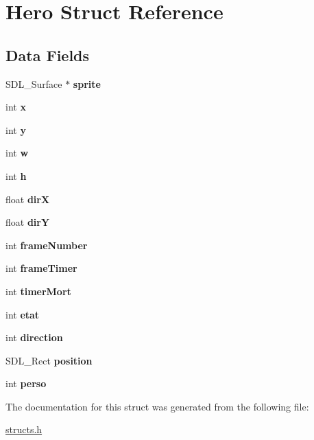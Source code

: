 \hypertarget{structHero}{}\section{Hero Struct Reference}
\label{structHero}
\subsection*{Data Fields}
\begin{DoxyCompactItemize}
\item 
\mbox{\label{structHero_ad857894baa28c986b4d8e5de10eb6473}} 
S\+D\+L\+\_\+\+Surface $\ast$ {\bfseries sprite}
\item 
\mbox{\label{structHero_a51935f2833c54a990f04eca42c6fae8b}} 
int {\bfseries x}
\item 
\mbox{\label{structHero_abb59184fcb4fc16c9e8a4762e764a33b}} 
int {\bfseries y}
\item 
\mbox{\label{structHero_ab4c9493008decd1a42cf6ec899c252af}} 
int {\bfseries w}
\item 
\mbox{\label{structHero_aeb4bffdb661fc37712d2052fe16dde72}} 
int {\bfseries h}
\item 
\mbox{\label{structHero_a5f39f26486843c33157a828f54cf3139}} 
float {\bfseries dirX}
\item 
\mbox{\label{structHero_a2afbc69f7880e2e2f1401f27bbece432}} 
float {\bfseries dirY}
\item 
\mbox{\label{structHero_ab752c1015845146622950630a806bd74}} 
int {\bfseries frame\+Number}
\item 
\mbox{\label{structHero_a23f2f105536856c827dca4954c8eb968}} 
int {\bfseries frame\+Timer}
\item 
\mbox{\label{structHero_a3c15fd1414e5c26aa4cce332b84dfeef}} 
int {\bfseries timer\+Mort}
\item 
\mbox{\label{structHero_a1ebca0786859803838d3057023052260}} 
int {\bfseries etat}
\item 
\mbox{\label{structHero_ab8693a2ae0acdd7dcd0cc82b70319d48}} 
int {\bfseries direction}
\item 
\mbox{\label{structHero_abc9595e897232ee4cf912e0e2c36bf28}} 
S\+D\+L\+\_\+\+Rect {\bfseries position}
\item 
\mbox{\label{structHero_ad78bd436b3b45aaaf64ef4e48e4d3a12}} 
int {\bfseries perso}
\end{DoxyCompactItemize}


The documentation for this struct was generated from the following file\+:\begin{DoxyCompactItemize}
\item 
\hyperlink{structs_8h}{structs.\+h}\end{DoxyCompactItemize}
